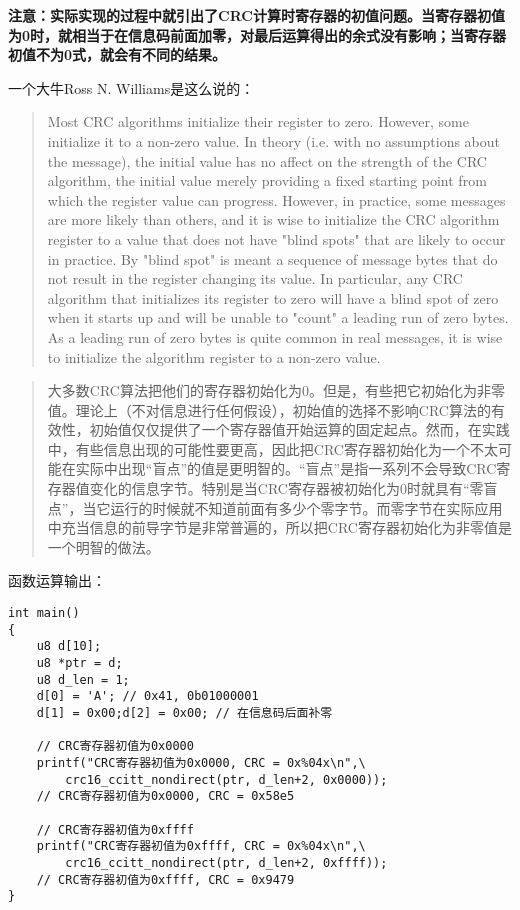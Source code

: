 \documentclass[
]{article}
\begin{document}
\textbf{注意：实际实现的过程中就引出了CRC计算时寄存器的初值问题。当寄存器初值为0时，就相当于在信息码前面加零，对最后运算得出的余式没有影响；当寄存器初值不为0式，就会有不同的结果。}

一个大牛Ross N. Williams是这么说的：

\begin{quote}
Most CRC algorithms initialize their register to zero. However, some
initialize it to a non-zero value. In theory (i.e. with no assumptions
about the message), the initial value has no affect on the strength of
the CRC algorithm, the initial value merely providing a fixed starting
point from which the register value can progress. However, in practice,
some messages are more likely than others, and it is wise to initialize
the CRC algorithm register to a value that does not have "blind spots"
that are likely to occur in practice. By "blind spot" is meant a
sequence of message bytes that do not result in the register changing
its value. In particular, any CRC algorithm that initializes its
register to zero will have a blind spot of zero when it starts up and
will be unable to "count" a leading run of zero bytes. As a leading run
of zero bytes is quite common in real messages, it is wise to initialize
the algorithm register to a non-zero value.
\end{quote}

\begin{quote}
大多数CRC算法把他们的寄存器初始化为0。但是，有些把它初始化为非零值。理论上（不对信息进行任何假设），初始值的选择不影响CRC算法的有效性，初始值仅仅提供了一个寄存器值开始运算的固定起点。然而，在实践中，有些信息出现的可能性要更高，因此把CRC寄存器初始化为一个不太可能在实际中出现``盲点''的值是更明智的。``盲点''是指一系列不会导致CRC寄存器值变化的信息字节。特别是当CRC寄存器被初始化为0时就具有``零盲点''，当它运行的时候就不知道前面有多少个零字节。而零字节在实际应用中充当信息的前导字节是非常普遍的，所以把CRC寄存器初始化为非零值是一个明智的做法。
\end{quote}

函数运算输出：

\begin{lstlisting}[style={c-style}]
int main()
{
    u8 d[10];
    u8 *ptr = d;
    u8 d_len = 1;
    d[0] = 'A'; // 0x41, 0b01000001
    d[1] = 0x00;d[2] = 0x00; // 在信息码后面补零
    
    // CRC寄存器初值为0x0000
    printf("CRC寄存器初值为0x0000, CRC = 0x%04x\n",\
        crc16_ccitt_nondirect(ptr, d_len+2, 0x0000));
    // CRC寄存器初值为0x0000, CRC = 0x58e5 
    
    // CRC寄存器初值为0xffff
    printf("CRC寄存器初值为0xffff, CRC = 0x%04x\n",\
        crc16_ccitt_nondirect(ptr, d_len+2, 0xffff));
    // CRC寄存器初值为0xffff, CRC = 0x9479
}
\end{lstlisting}
\end{document}
